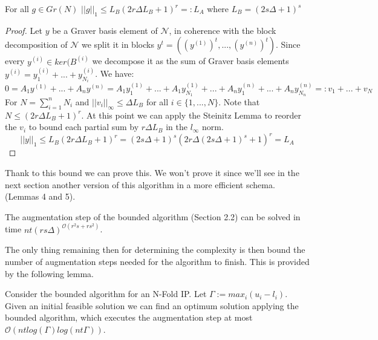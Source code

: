 \begin{lemma}
    For all $g \in Gr(N)$ $||g||_1 \leq L_B (2r\Delta L_B + 1)^r =: L_A$ where $L_B = (2s \Delta + 1)^s$
\end{lemma}
\vspace{-20pt}
\begin{proof}
Let $y$ be a Graver basis element of $\mathcal{N}$, in coherence with the block decomposition of $\mathcal{N}$ we split it in blocks $y^t = ((y^{(1)})^t, ... , (y^{(n)})^t)$. Since every $y^{(i)} \in ker(B^{(i)}$ we decompose it as the sum of Graver basis elements $y^{(i)} = y^{(i)}_1 +  ... + y^{(i)}_{N_i}$. We have:\\ %
\begin{equation*}
    0 = A_1y^{(1)} + ... + A_ny^{(n)} = A_1y^{(1)}_1 + ... + A_1y^{(1)}_{N_1} + ... + A_ny^{(n)}_1 + ... + A_ny^{(n)}_{N_n} =: v_1 + ... + v_N %
\end{equation*}
For $N = \sum_{i=1}^n N_i$ and $||v_i||_\infty \leq \Delta L_B$ for all $i \in \{1, ..., N\}$. Note that $N \leq (2r\Delta L_B + 1)^r$.  At this point we can apply the Steinitz Lemma to reorder the $v_i$ to bound each partial sum by $r\Delta L_B$ in the $l_\infty$ norm.\\
\begin{equation*}
    ||y||_1 \leq L_B(2r\Delta L_B + 1)^r = (2s\Delta + 1)^s(2r\Delta (2s\Delta + 1)^s + 1)^r = L_A
\end{equation*}

\end{proof}

Thank to this bound we can prove this. We won't prove it since we'll see in the next section another version of this algorithm in a more efficient schema. \cite{EISENBRAND:2018} (Lemmas 4 and 5).

\begin{lemma}
The augmentation step of the bounded algorithm (Section 2.2) can be solved in time $nt(rs\Delta)^{\mathcal{O}(r^2s+rs^2)}$.
\end{lemma}

The only thing remaining then for determining the complexity is then bound the number of augmentation steps needed for the algorithm to finish. This is provided by the following lemma.

\begin{lemma}
Consider the bounded algorithm for an N-Fold IP. Let $\Gamma := max_i(u_i - l_i)$. Given an initial feasible solution we can find an optimum solution applying the bounded algorithm, which executes the augmentation step at most $\mathcal{O}(nt log(\Gamma)log(nt\Gamma))$.  
\end{lemma}

